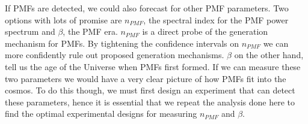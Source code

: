 If PMFs are detected, we could also forecast for other PMF parameters. Two options with lots of promise are $n_{PMF}$, the spectral index for the PMF power spectrum and $\beta$, the PMF era. $n_{PMF}$ is a direct probe of the generation mechanism for PMFs. By tightening the confidence intervals on $n_{PMF}$ we can more confidently rule out proposed generation mechanisms. $\beta$ on the other hand, tell us the age of the Universe when PMFs first formed. If we can measure these two parameters we would have a very clear picture of how PMFs fit into the cosmos. To do this though, we must first design an experiment that can detect these parameters, hence it is essential that we repeat the analysis done here to find the optimal experimental designs for measuring $n_{PMF}$ and $\beta$.
